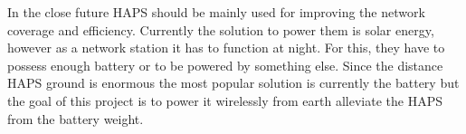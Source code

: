 In the close future HAPS should be mainly used for improving the network coverage and efficiency. Currently the solution to power them is solar energy, however as a network station it has to function at night. For this, they have to possess enough battery or to be powered by something else. Since the distance HAPS ground is enormous the most popular solution is currently the battery but the goal of this project is to power it wirelessly from earth alleviate the HAPS from the battery weight.